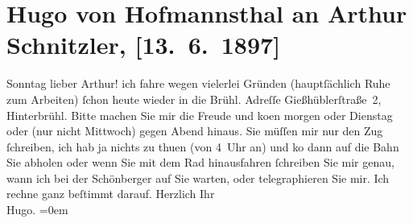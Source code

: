 

               \section[Hugo von Hofmannsthal an Arthur Schnitzler, {[}13. 6. 1897{]}]{ Hugo von Hofmannsthal an Arthur Schnitzler, {[}13. 6. 1897{]}}\nopagebreak{}\rehead{ }\begin{ledgroupsized}[t]{13cm}\normalsize\beginnumbering{} \toendnotes[C]{\smallbreak\pagebreak[2]} 
\toendnotes[C]{\smallbreak}\pstart
           \raggedleft{}{\pb}Sonntag\pend
           \pstart{}lieber Arthur!\pend\pstart
           ich fahre wegen vielerlei Gründen (hauptſächlich Ruhe zum Arbeiten) ſchon heute
                    wieder in die Brühl. Adreſſe Gießhüblerſtraße 2, Hinterbrühl. Bitte machen Sie mir die Freude und ko{\geminationm}en morgen oder Dienstag
                    oder {\pb}\label{K_L00687_1v}\label{K_L00687_1h} (nur nicht Mittwoch) gegen
                    Abend hinaus. Sie müſſen mir nur den Zug ſchreiben, ich hab ja nichts zu thuen
                    (von 4 Uhr an) und ko{\geminationm} dann auf die
                    Bahn Sie abholen oder wenn Sie mit dem Rad hinausfahren ſchreiben Sie mir genau,
                        {\pb}wann ich bei der Schönberger auf Sie warten, oder
                    telegraphieren Sie mir.\pend
           \pstart
           Ich rechne ganz beſtimmt darauf. Herzlich Ihr{\\[\baselineskip]}\spacefill\mbox{Hugo.}\pend
           \leftskip=0em{}\endnumbering{}\end{ledgroupsized}  \newcommand{\dateiname}{L00687}\newcommand{\titel}{Hugo von Hofmannsthal an Arthur Schnitzler, [13. 6. 1897]}\newcommand{\editorInnen}{Martin Anton Müller und Gerd-Hermann Susen}
            \footnotesize
\begin{ledgroupsized}[t]{11.5cm}
\end{ledgroupsized}
         
      